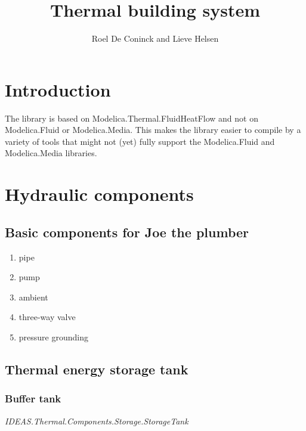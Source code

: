 
\title{Thermal building system}
\author{Roel De Coninck and Lieve Helsen}

\maketitle


\section{Introduction}

The library is based on Modelica.Thermal.FluidHeatFlow and not on Modelica.Fluid or Modelica.Media.  This makes the library easier to compile by a variety of tools that might not (yet) fully support the  Modelica.Fluid and Modelica.Media libraries.

\section{Hydraulic components}

\subsection{Basic components for Joe the plumber}

\begin{enumerate}
	\item pipe
	\item pump
	\item ambient
	\item three-way valve
	\item pressure grounding
\end{enumerate}

\subsection{Thermal energy storage tank}

\subsubsection{Buffer tank}

\emph{IDEAS.Thermal.Components.Storage.StorageTank}

